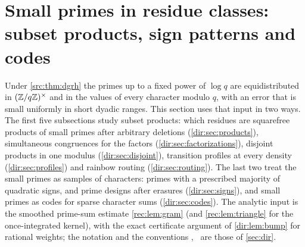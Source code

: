 \providecommand{\dirfiles}[1]{\par\smallskip\noindent
  {\footnotesize\raggedright\emph{Files:} #1.\par}\smallskip}
\providecommand{\dirP}{\mathbb{P}}
\providecommand{\dirE}{\mathbb{E}}
\providecommand{\dirU}{\mathrm{U}}
\section{Small primes in residue classes: subset products, sign patterns and codes}\label{sec:prd}

Under \cref{src:thm:dgrh} the primes up to a fixed power of $\log q$ are equidistributed in
$(\mathbb{Z}/q\mathbb{Z})^\times$ and in the values of every character modulo $q$, with an error that is small
uniformly in short dyadic ranges. This section uses that input in two ways. The first five
subsections study subset products: which residues are squarefree products of small primes after
arbitrary deletions (\cref{dir:sec:products}), simultaneous congruences for the factors
(\cref{dir:sec:factorizations}), disjoint products in one modulus (\cref{dir:sec:disjoint}), transition
profiles at every density (\cref{dir:sec:profiles}) and rainbow routing (\cref{dir:sec:routing}). The
last two treat the small primes as samples of characters: primes with a prescribed majority of
quadratic signs, and prime designs after erasures (\cref{dir:sec:signs}), and small primes as codes for
sparse character sums (\cref{dir:sec:codes}). The analytic input is the smoothed prime-sum estimate
\cref{rec:lem:gram} (and \cref{rec:lem:triangle} for the once-integrated kernel), with the exact
certificate argument of \cref{dir:lem:bump} for rational weights; the notation and the conventions
\stG, \stU\ are those of \cref{sec:dir}.

